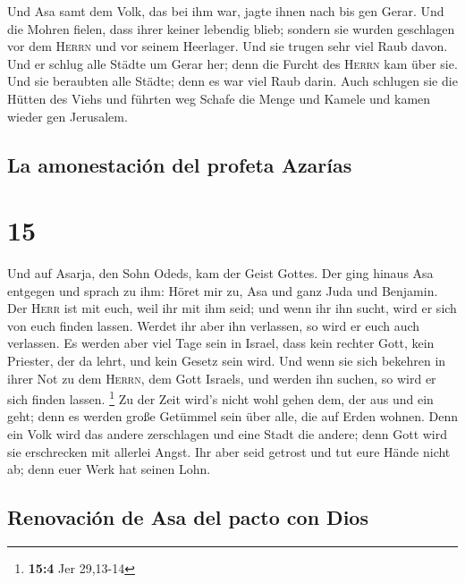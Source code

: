  Und Asa samt dem Volk, das bei ihm war, jagte ihnen nach
bis gen Gerar. Und die Mohren fielen, dass ihrer keiner lebendig blieb;
sondern sie wurden geschlagen vor dem \textsc{Herrn} und vor seinem
Heerlager. Und sie trugen sehr viel Raub davon.  Und er
schlug alle Städte um Gerar her; denn die Furcht des \textsc{Herrn} kam
über sie. Und sie beraubten alle Städte; denn es war viel Raub darin.
 Auch schlugen sie die Hütten des Viehs und führten weg
Schafe die Menge und Kamele und kamen wieder gen Jerusalem.

\hypertarget{la-amonestaciuxf3n-del-profeta-azaruxedas}{%
\subsection{La amonestación del profeta
Azarías}\label{la-amonestaciuxf3n-del-profeta-azaruxedas}}

\hypertarget{section-14}{%
\section{15}\label{section-14}}

 Und auf Asarja, den Sohn Odeds, kam der Geist Gottes.
 Der ging hinaus Asa entgegen und sprach zu ihm: Höret mir
zu, Asa und ganz Juda und Benjamin. Der \textsc{Herr} ist mit euch, weil
ihr mit ihm seid; und wenn ihr ihn sucht, wird er sich von euch finden
lassen. Werdet ihr aber ihn verlassen, so wird er euch auch verlassen.
 Es werden aber viel Tage sein in Israel, dass kein
rechter Gott, kein Priester, der da lehrt, und kein Gesetz sein wird.
 Und wenn sie sich bekehren in ihrer Not zu dem
\textsc{Herrn}, dem Gott Israels, und werden ihn suchen, so wird er sich
finden lassen. \footnote{\textbf{15:4} Jer 29,13-14}  Zu
der Zeit wird's nicht wohl gehen dem, der aus und ein geht; denn es
werden große Getümmel sein über alle, die auf Erden wohnen.
 Denn ein Volk wird das andere zerschlagen und eine Stadt
die andere; denn Gott wird sie erschrecken mit allerlei Angst.
 Ihr aber seid getrost und tut eure Hände nicht ab; denn
euer Werk hat seinen Lohn.

\hypertarget{renovaciuxf3n-de-asa-del-pacto-con-dios}{%
\subsection{Renovación de Asa del pacto con
Dios}\label{renovaciuxf3n-de-asa-del-pacto-con-dios}}

